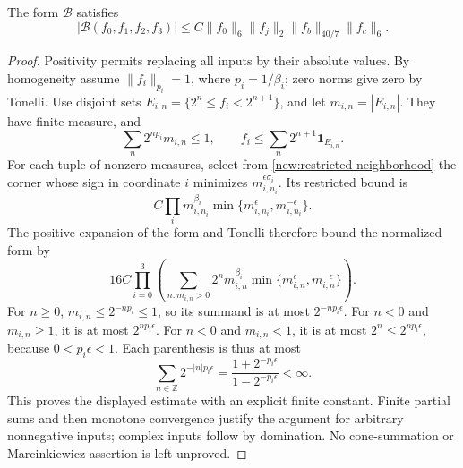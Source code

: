 \documentclass[11pt]{article}
\theoremstyle{definition}
\newcommand{\one}{\mathbf 1}
\begin{document}
\begin{lemma}
\label{new:restricted-strong}
The form $\mathcal B$ satisfies
\[
 |\mathcal B(f_0,f_1,f_2,f_3)|\leq C\|f_0\|_6\|f_j\|_2
                                      \|f_b\|_{40/7}\|f_c\|_6.
\]
\end{lemma}
\begin{proof}
Positivity permits replacing all inputs by their absolute values. By homogeneity assume
$\|f_i\|_{p_i}=1$, where $p_i=1/\beta_i$; zero norms give zero by Tonelli.
Use disjoint sets $E_{i,n}=\{2^n\leq f_i<2^{n+1}\}$, and let $m_{i,n}=|E_{i,n}|$.
They have finite measure, and
\[
 \sum_n2^{np_i}m_{i,n}\leq1,\qquad
 f_i\leq\sum_n2^{n+1}\one_{E_{i,n}}.
\]
For each tuple of nonzero measures, select from \cref{new:restricted-neighborhood} the
corner whose sign in coordinate $i$ minimizes $m_{i,n_i}^{\epsilon\sigma_i}$.
Its restricted bound is
\[
 C\prod_i m_{i,n_i}^{\beta_i}
                   \min\{m_{i,n_i}^{\epsilon},m_{i,n_i}^{-\epsilon}\}.
\]
The positive expansion of the form and Tonelli therefore bound the normalized form by
\[
 16C\prod_{i=0}^3\left(\sum_{n:m_{i,n}>0}
       2^n m_{i,n}^{\beta_i}
              \min\{m_{i,n}^{\epsilon},m_{i,n}^{-\epsilon}\}\right).
\]
For $n\geq0$, $m_{i,n}\leq2^{-np_i}\leq1$, so its summand is at most
$2^{-np_i\epsilon}$. For $n<0$ and $m_{i,n}\geq1$, it is at most $2^{np_i\epsilon}$.
For $n<0$ and $m_{i,n}<1$, it is at most $2^n\leq2^{np_i\epsilon}$, because
$0<p_i\epsilon<1$. Each parenthesis is thus at most
\[
 \sum_{n\in\mathbb Z}2^{-|n|p_i\epsilon}
 =\frac{1+2^{-p_i\epsilon}}{1-2^{-p_i\epsilon}}<\infty.
\]
This proves the displayed estimate with an explicit finite constant. Finite partial sums
and then monotone convergence justify the argument for arbitrary nonnegative inputs;
complex inputs follow by domination. No cone-summation or Marcinkiewicz assertion is left
unproved.
\end{proof}
\end{document}
